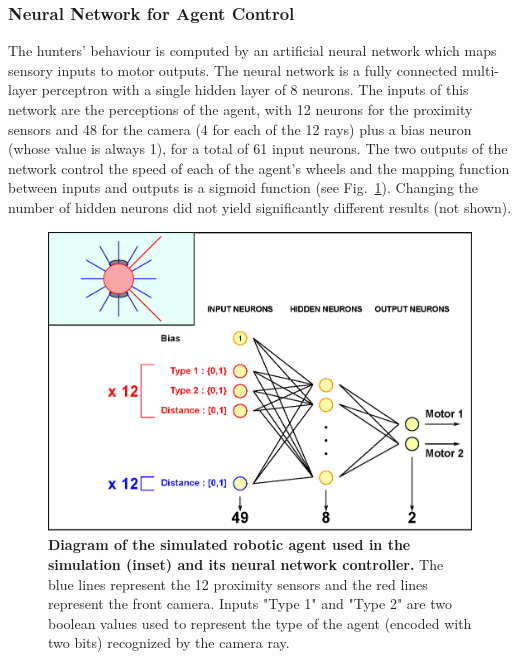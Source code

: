     \subsubsection{Neural Network for Agent Control}
    \label{nn}
      The hunters' behaviour is computed by an artificial neural network which maps sensory inputs to motor outputs. The neural network is a fully connected multi-layer perceptron with a single hidden layer of 8 neurons. The inputs of this network are the perceptions of the agent, with 12 neurons for the proximity sensors and 48 for the camera (4 for each of the 12 rays) plus a bias neuron (whose value is always 1), for a total of 61 input neurons. The two outputs of the network control the speed of each of the agent's wheels and the mapping function between inputs and outputs is a sigmoid function (see Fig.~\ref{fig:robotDescription}). Changing the number of hidden neurons did not yield significantly different results (not shown).

      \begin{figure}[hbtp]
        \centering
          \includegraphics[scale = 0.5]{fig/ArticleBio1/Fig2.eps}
          \caption{\textbf{Diagram of the simulated robotic agent used in the simulation (inset) and its neural network controller.}
          The blue lines represent the 12 proximity sensors and the red lines represent the front camera. Inputs "Type 1" and "Type 2" are two boolean values used to represent the type of the agent (encoded with two bits) recognized by the camera ray.}
        \label{fig:robotDescription}
      \end{figure}


